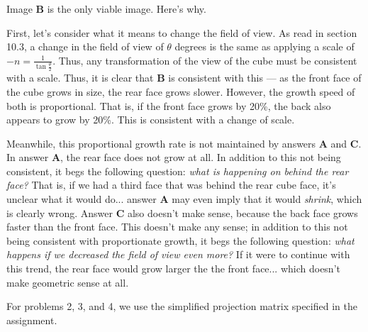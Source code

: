 \documentclass[11pt]{tingpset}
\begin{document}
  \makeheader

    Image \textbf{B} is the only viable image. Here's why.

    First, let's consider what it means to change the field of view. As read in section 10.3, a change in the field of view of $\theta$ degrees is the same as applying a scale of $-n = \frac{1}{\tan \frac{\theta}{2}}$. Thus, any transformation of the view of the cube must be consistent with a scale. Thus, it is clear that \textbf{B} is consistent with this --- as the front face of the cube grows in size, the rear face grows slower. However, the growth speed of both is proportional. That is, if the front face grows by 20\%, the back also appears to grow by 20\%. This is consistent with a change of scale.

    Meanwhile, this proportional growth rate is not maintained by answers \textbf{A} and \textbf{C}. In answer \textbf{A}, the rear face does not grow at all. In addition to this not being consistent, it begs the following question: \emph{what is happening on behind the rear face?} That is, if we had a third face that was behind the rear cube face, it's unclear what it would do... answer \textbf{A} may even imply that it would \emph{shrink}, which is clearly wrong. Answer \textbf{C} also doesn't make sense, because the back face grows faster than the front face. This doesn't make any sense; in addition to this not being consistent with proportionate growth, it begs the following question: \emph{what happens if we decreased the field of view even more?} If it were to continue with this trend, the rear face would grow larger the the front face... which doesn't make geometric sense at all.

  \pagebreak
    For problems 2, 3, and 4, we use the simplified projection matrix specified in the assignment.
\end{document}
